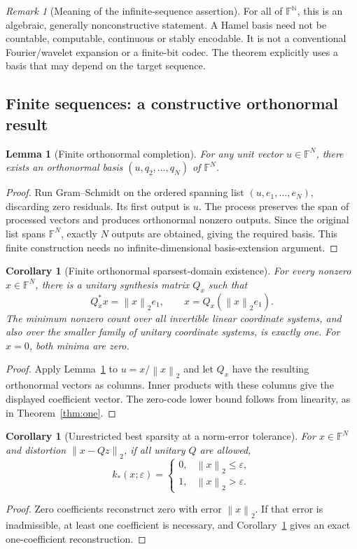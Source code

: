 \documentclass[11pt,a4paper]{article}
\newtheorem{lemma}[theorem]{Lemma}
\newtheorem{corollary}[theorem]{Corollary}
\theoremstyle{definition}
\theoremstyle{remark}
\newtheorem*{remark}{Remark}
\newcommand{\F}{\mathbb F}
\newcommand{\N}{\mathbb N}
\newcommand{\norm}[1]{\left\lVert#1\right\rVert}
\begin{document}
\begin{remark}[Meaning of the infinite-sequence assertion]
For all of $\F^\N$, this is an algebraic, generally nonconstructive statement.
A Hamel basis need not be countable, computable, continuous or stably encodable.
It is not a conventional Fourier/wavelet expansion or a finite-bit codec.
The theorem explicitly uses a basis that may depend on the target sequence.
\end{remark}

\subsection{Finite sequences: a constructive orthonormal result}

\begin{lemma}[Finite orthonormal completion]\label{lem:orthogonal}
For any unit vector $u\in\F^N$, there exists an orthonormal basis
$(u,q_2,\ldots,q_N)$ of $\F^N$.
\end{lemma}
\begin{proof}
Run Gram--Schmidt on the ordered spanning list
$(u,e_1,\ldots,e_N)$, discarding zero residuals. Its first output is $u$.
The process preserves the span of processed vectors and produces orthonormal
nonzero outputs. Since the original list spans $\F^N$, exactly $N$ outputs
are obtained, giving the required basis. This finite construction needs no
infinite-dimensional basis-extension argument.
\end{proof}

\begin{corollary}[Finite orthonormal sparsest-domain existence]\label{cor:orthonormal}
For every nonzero $x\in\F^N$, there is a unitary synthesis matrix $Q_x$ such that
\[
Q_x^*x=\norm{x}_2e_1,
\qquad
x=Q_x(\norm{x}_2e_1).
\]
The minimum nonzero count over all invertible linear coordinate systems, and
also over the smaller family of unitary coordinate systems, is exactly one.
For $x=0$, both minima are zero.
\end{corollary}
\begin{proof}
Apply Lemma~\ref{lem:orthogonal} to $u=x/\norm{x}_2$ and let $Q_x$ have the
resulting orthonormal vectors as columns. Inner products with these columns
give the displayed coefficient vector. The zero-code lower bound follows
from linearity, as in Theorem~\ref{thm:one}.
\end{proof}

\begin{corollary}[Unrestricted best sparsity at a norm-error tolerance]\label{cor:approx}
For $x\in\F^N$ and distortion $\norm{x-Qz}_2$, if all unitary $Q$ are allowed,
\[
k_*(x;\varepsilon)=
\begin{cases}
0,&\norm{x}_2\leq\varepsilon,\\
1,&\norm{x}_2>\varepsilon.
\end{cases}
\]
\end{corollary}
\begin{proof}
Zero coefficients reconstruct zero with error $\norm{x}_2$. If that error is
inadmissible, at least one coefficient is necessary, and
Corollary~\ref{cor:orthonormal} gives an exact one-coefficient reconstruction.
\end{proof}
\end{document}
